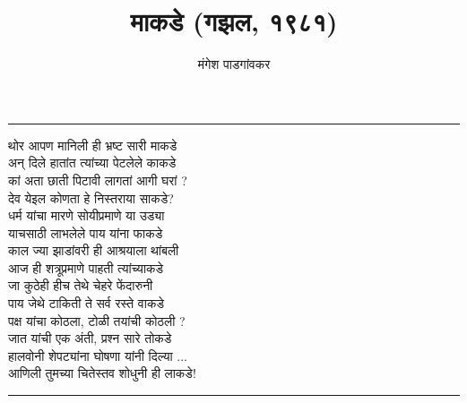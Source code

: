 \documentclass[17pt]{extarticle}  %
\begin{document}
\title{माकडे (गझल, १९८१)}
\author{मंगेश पाडगांवकर}
\date{}
\maketitle
\hrule

थोर आपण मानिली ही भ्रष्ट सारी माकडे\\
अन् दिले हातांत त्यांच्या पेटलेले काकडे\\

कां अता छाती पिटावी लागतां आगी घरां ?\\
देव येइल कोणता हे निस्तराया साकडे?\\

धर्म यांचा मारणे सोयीप्रमाणे या उड्या\\
याचसाठी लाभलेले पाय यांना फाकडे\\

काल ज्या झाडांवरी ही आश्रयाला थांबली\\
आज ही शत्रूप्रमाणे पाहती त्यांच्याकडे\\

जा कुठेही हीच तेथे चेहरे फेंदारुनी\\
पाय जेथे टाकिती ते सर्व रस्ते वाकडे\\

पक्ष यांचा कोठला, टोळी तयांची कोठली ?\\
जात यांची एक अंती, प्रश्न सारे तोकडे\\

हालवोनी शेपट्यांना घोषणा यांनी दिल्या ...\\
आणिली तुमच्या चितेस्तव शोधुनी ही लाकडे!\\

\vspace{5mm}
\hrule
\end{document}
